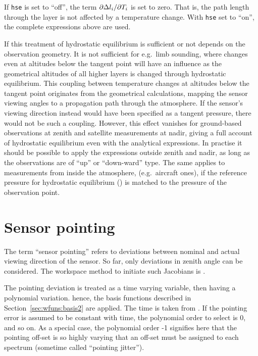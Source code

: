 If \verb|hse| is set to ``off'', the term $\partial \Delta l_{i}/\partial
T_{i}$ is set to zero. That is, the path length through the layer is not
affected by a temperature change. With \verb|hse| set to ``on'', the complete
expressions above are used.

If this treatment of hydrostatic equilibrium is sufficient or not depends on
the observation geometry. It is not sufficient for e.g.\ limb sounding, where
changes even at altitudes below the tangent point will have an influence as the
geometrical altitudes of all higher layers is changed through hydrostatic
equilibrium. This coupling between temperature changes at altitudes below the
tangent point originates from the geometrical calculations, mapping the sensor
viewing angles to a propagation path through the atmosphere. If the sensor's
viewing direction instead would have been specified as a tangent pressure, there
would not be such a coupling. However, this effect vanishes for ground-based
observations at zenith and satellite measurements at nadir, giving a full
account of hydrostatic equilibrium even with the analytical expressions. In
practise it should be possible to apply the expressions outside zenith and
nadir, as long as the observations are of ``up'' or ``down-ward'' type. The
same applies to measurements from inside the atmosphere, (e.g.\ aircraft ones),
if the reference pressure for hydrostatic equilibrium ()
is matched to the pressure of the observation point.





\section{Sensor pointing}
\label{sec:wfuns:sensorpointing}

The term ``sensor pointing'' refers to deviations between nominal and
actual viewing direction of the sensor. So far, only deviations in zenith angle
can be considered. The workspace method to initiate such Jacobians is
.

The pointing deviation is treated as a time varying variable, then having a
polynomial variation. hence, the basis functions described in
Section~\ref{sec:wfuns:basis2} are applied. The time is taken from
. If the pointing error is assumed to be constant with
time, the polynomial order to select is 0, and so on. As a special case, the
polynomial order -1 signifies here that the pointing off-set is so highly
varying that an off-set must be assigned to each spectrum
(sometime called ``pointing jitter'').

